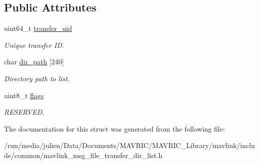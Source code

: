 \subsection*{Public Attributes}
\begin{DoxyCompactItemize}
\item 
\hypertarget{struct____mavlink__file__transfer__dir__list__t_ae4cbacc008aa59f7a6911f4723d0bc4c}{uint64\+\_\+t \hyperlink{struct____mavlink__file__transfer__dir__list__t_ae4cbacc008aa59f7a6911f4723d0bc4c}{transfer\+\_\+uid}}\label{struct____mavlink__file__transfer__dir__list__t_ae4cbacc008aa59f7a6911f4723d0bc4c}

\begin{DoxyCompactList}\small\item\em Unique transfer I\+D. \end{DoxyCompactList}\item 
\hypertarget{struct____mavlink__file__transfer__dir__list__t_aba9009fc7a7460bc54292796740ce9e3}{char \hyperlink{struct____mavlink__file__transfer__dir__list__t_aba9009fc7a7460bc54292796740ce9e3}{dir\+\_\+path} \mbox{[}240\mbox{]}}\label{struct____mavlink__file__transfer__dir__list__t_aba9009fc7a7460bc54292796740ce9e3}

\begin{DoxyCompactList}\small\item\em Directory path to list. \end{DoxyCompactList}\item 
\hypertarget{struct____mavlink__file__transfer__dir__list__t_a4f9a35692a267921d35fbace8507b581}{uint8\+\_\+t \hyperlink{struct____mavlink__file__transfer__dir__list__t_a4f9a35692a267921d35fbace8507b581}{flags}}\label{struct____mavlink__file__transfer__dir__list__t_a4f9a35692a267921d35fbace8507b581}

\begin{DoxyCompactList}\small\item\em R\+E\+S\+E\+R\+V\+E\+D. \end{DoxyCompactList}\end{DoxyCompactItemize}


The documentation for this struct was generated from the following file\+:\begin{DoxyCompactItemize}
\item 
/run/media/julien/\+Data/\+Documents/\+M\+A\+V\+R\+I\+C/\+M\+A\+V\+R\+I\+C\+\_\+\+Library/mavlink/include/common/mavlink\+\_\+msg\+\_\+file\+\_\+transfer\+\_\+dir\+\_\+list.\+h\end{DoxyCompactItemize}
